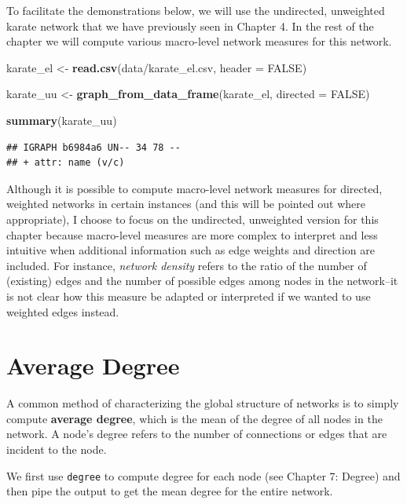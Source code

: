 \documentclass[
]{book}
\newenvironment{Shaded}{\begin{snugshade}}{\end{snugshade}}
\newcommand{\AttributeTok}[1]{\textcolor[rgb]{0.13,0.29,0.53}{#1}}
\newcommand{\ConstantTok}[1]{\textcolor[rgb]{0.56,0.35,0.01}{#1}}
\newcommand{\FunctionTok}[1]{\textcolor[rgb]{0.13,0.29,0.53}{\textbf{#1}}}
\newcommand{\NormalTok}[1]{#1}
\newcommand{\OtherTok}[1]{\textcolor[rgb]{0.56,0.35,0.01}{#1}}
\newcommand{\StringTok}[1]{\textcolor[rgb]{0.31,0.60,0.02}{#1}}
\begin{document}
To facilitate the demonstrations below, we will use the undirected, unweighted karate network that we have previously seen in Chapter 4. In the rest of the chapter we will compute various macro-level network measures for this network.

\begin{Shaded}
\begin{Highlighting}[]
\NormalTok{karate\_el }\OtherTok{\textless{}{-}} \FunctionTok{read.csv}\NormalTok{(}\StringTok{\textquotesingle{}data/karate\_el.csv\textquotesingle{}}\NormalTok{, }\AttributeTok{header =} \ConstantTok{FALSE}\NormalTok{)}

\NormalTok{karate\_uu }\OtherTok{\textless{}{-}} \FunctionTok{graph\_from\_data\_frame}\NormalTok{(karate\_el, }\AttributeTok{directed =} \ConstantTok{FALSE}\NormalTok{)}

\FunctionTok{summary}\NormalTok{(karate\_uu)}
\end{Highlighting}
\end{Shaded}

\begin{verbatim}
## IGRAPH b6984a6 UN-- 34 78 -- 
## + attr: name (v/c)
\end{verbatim}

Although it is possible to compute macro-level network measures for directed, weighted networks in certain instances (and this will be pointed out where appropriate), I choose to focus on the undirected, unweighted version for this chapter because macro-level measures are more complex to interpret and less intuitive when additional information such as edge weights and direction are included. For instance, \emph{network density} refers to the ratio of the number of (existing) edges and the number of possible edges among nodes in the network--it is not clear how this measure be adapted or interpreted if we wanted to use weighted edges instead.

\section{Average Degree}\label{average-degree}

A common method of characterizing the global structure of networks is to simply compute \textbf{average degree}, which is the mean of the degree of all nodes in the network. A node's degree refers to the number of connections or edges that are incident to the node.

We first use \texttt{degree} to compute degree for each node (see Chapter 7: Degree) and then pipe the output to get the mean degree for the entire network.
\end{document}
